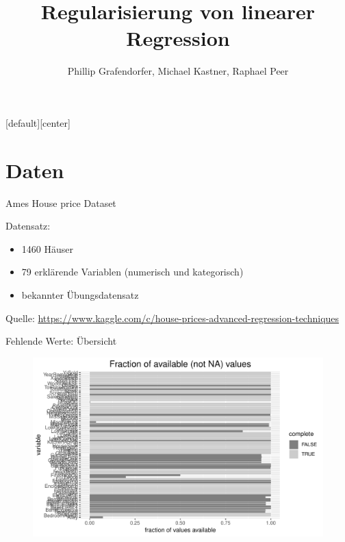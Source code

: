 \documentclass[10pt]{beamer}
\title{Regularisierung von linearer Regression}
\date{}
\author{Phillip Grafendorfer, Michael Kastner, Raphael Peer}
\begin{document}
[default][center]

\maketitle

\section{Daten}


\begin{frame}{Ames House price Dataset}
	
	\begin{Large}
		Datensatz:
	\end{Large}
	\begin{itemize}
		\item 1460 Häuser
		\item 79 erklärende Variablen (numerisch und kategorisch)
		\item bekannter Übungsdatensatz
	\end{itemize}
	
	\begin{Tiny}		
		Quelle: \url{https://www.kaggle.com/c/house-prices-advanced-regression-techniques}
	\end{Tiny}
\end{frame}


\begin{frame}{Fehlende Werte: Übersicht}
	
	\begin{figure}
		\includegraphics[width=\textwidth, keepaspectratio]{figures/na_stats}
	\end{figure}
	
\end{frame}
\end{document}
